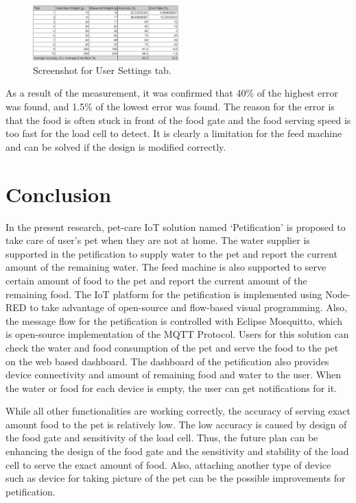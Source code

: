 \documentclass[conference]{IEEEtran}
\begin{document}
\begin{figure}[htbp]
\centerline{\includegraphics[width=0.5\textwidth]{./images/Feeding_sheet.jpg}}
\caption{Screenshot for User Settings tab.}
\label{fig}
\end{figure}

As a result of the measurement, it was confirmed that 40\% of the highest error was found, and 1.5\% of the lowest error was found. The reason for the error is that the food is often stuck in front of the food gate and the food serving speed is too fast for the load cell to detect. It is clearly a limitation for the feed machine and can be solved if the design is modified correctly.

\section{Conclusion}
In the present research, pet-care IoT solution named ‘Petification’ is proposed to take care of user’s pet when they are not at home. The water supplier is supported in the petification to supply water to the pet and report the current amount of the remaining water. The feed machine is also supported to serve certain amount of food to the pet and report the current amount of the remaining food. The IoT platform for the petification is implemented using Node-RED to take advantage of open-source and flow-based visual programming. Also, the message flow for the petification is controlled with Eclipse Mosquitto, which is open-source implementation of the MQTT Protocol. Users for this solution can check the water and food consumption of the pet and serve the food to the pet on the web based dashboard. The dashboard of the petification also provides device connectivity and amount of remaining food and water to the user. When the water or food for each device is empty, the user can get notifications for it.

While all other functionalities are working correctly, the accuracy of serving exact amount food to the pet is relatively low. The low accuracy is caused by design of the food gate and sensitivity of the load cell. Thus, the future plan can be enhancing the design of the food gate and the sensitivity and stability of the load cell to serve the exact amount of food. Also, attaching another type of device such as device for taking picture of the pet can be the possible improvements for petification.
\end{document}
